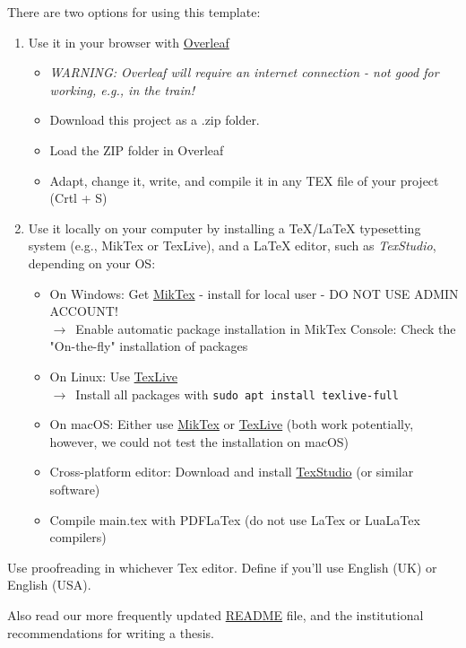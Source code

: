 \documentclass[12pt,oneside]{article}
\begin{document}
	There are two options for using this template:
	\begin{enumerate}
		\item Use it in your browser with \href{https://www.overleaf.com/}{Overleaf}
			\begin{itemize}
				\item[] \textit{WARNING: Overleaf will require an internet connection - not good for working, e.g., in the train!}
				\item Download this project as a .zip folder.
				\item Load the ZIP folder in Overleaf
				\item Adapt, change it, write, and compile it in any TEX file of your project (Crtl + S)
			\end{itemize}
		\item Use it locally on your computer by installing a TeX/LaTeX typesetting system (e.g., MikTex or TexLive), and a LaTeX editor, such as \textit{TexStudio}, depending on your OS:
			\begin{itemize}
				\item On Windows: Get \href{https://miktex.org/howto/install-miktex}{MikTex} - install for local user - DO NOT USE ADMIN ACCOUNT!
				\\ $\rightarrow$~Enable automatic package installation in MikTex Console: Check the "On-the-fly" installation of packages
				\item On Linux: Use \href{https://en.wikipedia.org/wiki/TeX_Live}{TexLive}\\ $\rightarrow$~Install all packages with \texttt{sudo apt install texlive-full}
				\item On macOS: Either use \href{https://miktex.org/howto/install-miktex}{MikTex} or \href{https://en.wikipedia.org/wiki/TeX_Live}{TexLive} (both work potentially, however, we could not test the installation on macOS)
				\item Cross-platform editor: Download and install \href{https://www.texstudio.org/}{TexStudio} (or similar software)
				\item Compile main.tex with PDFLaTex (do not use LaTex or LuaLaTex compilers)
			\end{itemize} 
	\end{enumerate}

	 Use proofreading in whichever Tex editor. Define if you'll use English (UK) or English (USA).
	 
	 Also read our more frequently updated \href{https://github.com/Ecohydraulics/latex-thesis-template/blob/main/README.md}{README} file, and the institutional recommendations for writing a thesis.
\end{document}
